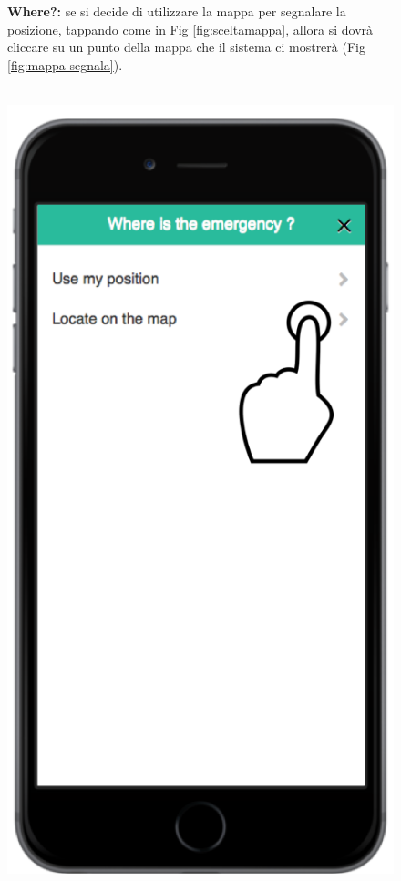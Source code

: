  \begin{figure}
\textbf{Where?:} se si decide di utilizzare la mappa per segnalare la posizione, tappando come in Fig \ref{fig:sceltamappa}, allora si dovrà cliccare su un punto della mappa che il sistema ci mostrerà (Fig \ref{fig:mappa-segnala}).
 \\ \\
 \begin{minipage}[b]{6cm}
   \centering
\includegraphics[scale=0.9]{interfaccia/sceltamap.png}

\end{minipage}
\end{figure}
